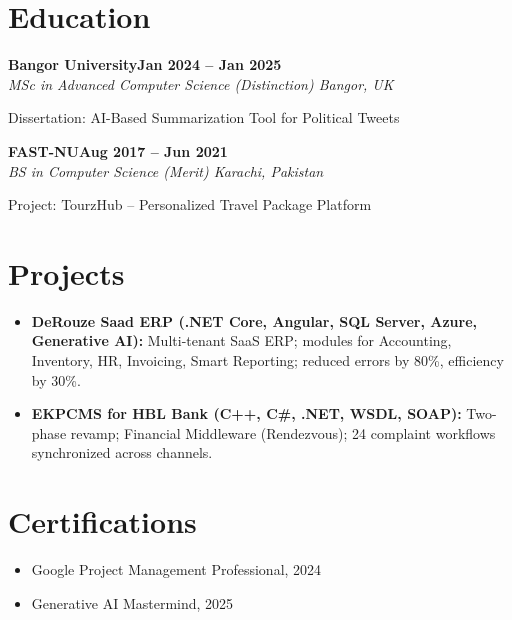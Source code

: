 \documentclass[letterpaper,10pt]{article}
\newcommand{\headingBf}[2]{
  \hspace{10pt}\textbf{#1}\hfill\textbf{#2}\\
}
\newcommand{\headingIt}[2]{
  \hspace{10pt}\textit{#1}\hfill\textit{#2}\\
}
\newenvironment{resume_list}{
  \vspace{-7pt}
  \begin{itemize}[itemsep=-2px, parsep=1pt, leftmargin=30pt]
}{
  \end{itemize}
}
\begin{document}
\section{Education}

\headingBf{Bangor University}{Jan 2024 -- Jan 2025}
\headingIt{MSc in Advanced Computer Science (Distinction) \hfill Bangor, UK}{}
\begin{resume_list}
    \item Dissertation: AI-Based Summarization Tool for Political Tweets
\end{resume_list}

\headingBf{FAST-NU}{Aug 2017 -- Jun 2021}
\headingIt{BS in Computer Science (Merit) \hfill Karachi, Pakistan}{}
\begin{resume_list}
    \item Project: TourzHub -- Personalized Travel Package Platform
\end{resume_list}

\section{Projects}
\begin{itemize}
    \setlength\itemsep{3pt}
    \item \textbf{DeRouze Saad ERP (.NET Core, Angular, SQL Server, Azure, Generative AI):} Multi-tenant SaaS ERP; modules for Accounting, Inventory, HR, Invoicing, Smart Reporting; reduced errors by 80\%, efficiency by 30\%.
    \item \textbf{EKPCMS for HBL Bank (C++, C\#, .NET, WSDL, SOAP):} Two-phase revamp; Financial Middleware (Rendezvous); 24 complaint workflows synchronized across channels.
\end{itemize}

\section{Certifications}
\begin{itemize}
    \item Google Project Management Professional, 2024
    \item Generative AI Mastermind, 2025
\end{itemize}

\vspace*{\fill}
\end{document}
